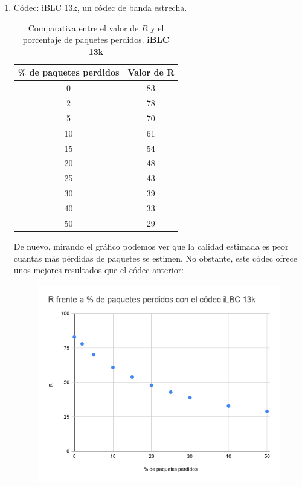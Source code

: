 \documentclass[11pt,a4paper]{article}
\begin{document}
\begin{enumerate}
	\item Códec: iBLC 13k, un códec de banda estrecha.
	
	\begin{table}[H]
	\centering
		\begin{tabular}{|c|c|}
		\hline
		\textbf{\% de paquetes perdidos} & \textbf{Valor de R} \\ \hline
			0                                & 83                  \\ \hline
			2                                & 78                  \\ \hline
			5                                & 70                  \\ \hline
			10                               & 61                  \\ \hline
			15                               & 54                  \\ \hline
			20                               & 48                  \\ \hline
			25                               & 43                  \\ \hline
			30                               & 39                  \\ \hline
			40                               & 33                  \\ \hline
			50                               & 29                  \\ \hline
		\end{tabular}
	\caption{Comparativa entre el valor de $R$ y el porcentaje de paquetes perdidos. \textbf{iBLC 13k}}
	\end{table}
	
De nuevo, mirando el gráfico podemos ver que la calidad estimada es peor cuantas más pérdidas de paquetes se estimen. No obstante, este códec ofrece unos mejores resultados que el códec anterior:

	\begin{figure}[H]
	\centering
		\includegraphics[scale=0.5]{img/grafico2.png}
	\end{figure}

\end{enumerate}
\end{document}
